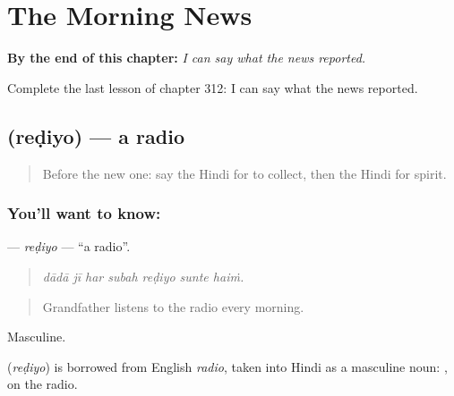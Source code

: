 
\chapter{The Morning News}
\label{ch:hi-the-morning-news}

\begin{chapteropening}
\textbf{By the end of this chapter:} \emph{I can say what the news reported.}

Complete the last lesson of chapter 312: I can say what the news reported.
\end{chapteropening}

\section[\texorpdfstring{\hi{रेडियो} (reḍiyo)}{रेडियो (reḍiyo)}]{ (reḍiyo) — a radio}

\label{lesson:HI-C312-rediyo}



\begin{quote}
Before the new one: say the Hindi for to collect, then the Hindi for spirit.
\end{quote}

\subsection*{You'll want to know: }
\textbf{} — \emph{reḍiyo} — \textquotedblleft{}a radio\textquotedblright{}.

\begin{quote}
      
\end{quote}

\begin{quote}
\emph{dādā jī har subah reḍiyo sunte haiṁ.}
\end{quote}

\begin{quote}
Grandfather listens to the radio every morning.
\end{quote}

Masculine.

\begin{cousinweb}
\textbf{} (\emph{reḍiyo}) is borrowed from English \emph{radio}, taken into Hindi as a masculine noun: \textbf{ }, on the radio.
\end{cousinweb}

